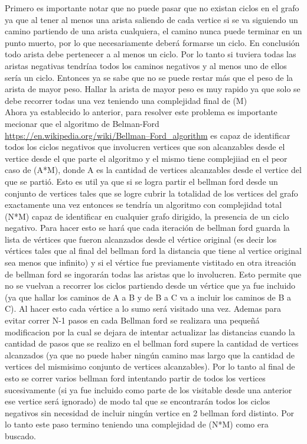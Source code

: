  Primero es importante notar que no puede pasar que no existan ciclos en el grafo ya que al tener al menos una arista saliendo de cada vertice si se va siguiendo un camino partiendo de una arista cualquiera, el camino nunca puede terminar en un punto muerto, por lo que necesariamente deberá formarse un ciclo. En conclusión todo arista debe pertenecer a al menos un ciclo. Por lo tanto si tuviera todas las aristas negativas tendríaa todos los caminos negativos y al menos uno de ellos sería un ciclo. Entonces ya se sabe que no se puede restar más que el peso de la arista de mayor peso. Hallar la arista de mayor peso es muy rapido ya que solo se debe recorrer todas una vez teniendo una complejidad final de \bigo(M)\\
Ahora ya establecido lo anterior, para resolver este problema es importante mecionar que el algoritmo de Belman-Ford \url{https://en.wikipedia.org/wiki/Bellman–Ford_algorithm} es capaz de identificar todos los ciclos negativos que involucren vertices que son alcanzables desde el vertice desde el que parte el algoritmo y el mismo tiene complejiiad en el peor caso de \bigo(A*M), donde A es la cantidad de vertices alcanzables desde el vertice del que se partió. Esto es util ya que si se logra partir el bellman ford desde un conjunto de vertices tales que se logre cubrir la totalidad de los vertices del grafo exactamente una vez entonces se tendría un algoritmo con complejidad total \bigo(N*M) capaz de identificar en cualquier grafo dirigido, la presencia de un ciclo negativo. Para hacer esto se hará que cada iteración de bellman ford guarda la lista de vértices que fueron alcanzados desde el vértice original (es decir los vértices tales que al final del bellman ford la distancia que tiene al vertice original sea menos que infinito) y si el vértice fue previamente vistitado en otra itreación de bellman ford se ingorarán todas las aristas que lo involucren. Esto permite que no se vuelvan a recorrer los ciclos partiendo desde un vértice que ya fue incluido (ya que hallar los caminos de A a B y de B a C va a incluir los caminos de B a C). Al hacer esto cada vértice a lo sumo será visitado una vez. Ademas para evitar correr N-1 pasos en cada Bellman ford se realizara una pequeñá modificacion por la cual se dejara de intentar actualizar las distancias cuando la cantidad de pasos que se realizo en el bellman ford supere la cantidad de vertices alcanzados (ya que no puede haber ningún camino mas largo que la cantidad de vertices del mismisimo conjunto de vertices alcanzables). Por lo tanto al final de esto se correr varios bellman ford intentando partir de todos los vertices sucesivamente (si ya fue incluido como parte de los visitable desde una anterior ese vertice será ignorado) de modo tal que se encontrarán todos los ciclos negativos sin necesidad de incluir ningún vertice en 2 bellman ford distinto. Por lo tanto este paso termino teniendo una complejidad de \bigo(N*M) como era buscado.\\
